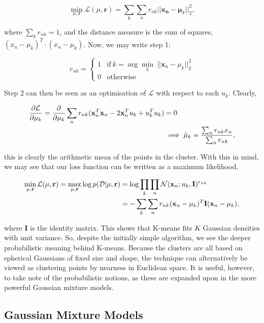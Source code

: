 \documentclass[11pt]{amsart}
\begin{document}
$$\min_{\mu, \mathbf{r}} \mathcal{L}(\mu, \mathbf{r}) = \sum_k\sum_n r_{nk}||\mathbf{x_n} - \mathbf{\mu}_k||^2_2,$$

where $\sum_k r_{nk} = 1$, and the distance measure is the sum of squares, $(x_n - \mu_k)^T\cdot(x_n - \mu_k)$. Now, we may write step 1:

\[r_{nk} = \begin{cases}
    1 & \text{if} \ k = \arg \min_k \ ||\mathbf{x}_n - \mu_k||_2^2 \\
    0 & \text{otherwise}
\end{cases}\]

Step 2 can then be seen as an optimisation of $\mathcal{L}$ with respect to each $u_k$. Clearly,

\begin{align}\frac{\partial\mathcal{L}}{\partial\mu_k} = \frac{\partial}{\partial\mu_k}\sum_n r_{nk} (\mathbf{x}_n^T\mathbf{x}_n - 2\mathbf{x}_n^Tu_k + u_k^Tu_k) &= 0 \notag \\
&\implies \hat{\mu}_k = \frac{\sum_nr_{nk}x_n}{\sum_nr_{nk}}, \notag
\end{align}

this is clearly the arithmetic mean of the points in the cluster. With this in mind, we may see that our loss function can be written as a maximum likelihood,

\begin{align}\min_{\mu, \mathbf{r}} \mathcal{L}(\mu, \mathbf{r}) = \max_{\mu, \mathbf{r}} \log p(\mathcal{D} | \mu, \mathbf{r}) &= \log\prod_k\prod_n \mathcal{N}(\mathbf{x}_n ; u_k, \mathbf{I})^{r_{nk}} \notag \\
&= -\sum_k\sum_nr_{nk}(\mathbf{x}_n - \mu_k)^T\mathbf{I}(\mathbf{x}_n - \mu_k), \notag
\end{align}

where $\mathbf{I}$ is the identity matrix. This shows that K-means fits $K$ Gaussian densities with unit variance. So, despite the initially simple algorithm, we see the deeper probabilistic meaning behind K-means. Because the clusters are all based on spherical Gaussians of fixed size and shape, the technique can alternatively be viewed as clustering points by nearness in Euclidean space. It is useful, however, to take note of the probabilistic notions, as these are expanded upon in the more powerful Gaussian mixture models.

\subsection{Gaussian Mixture Models}
\end{document}
